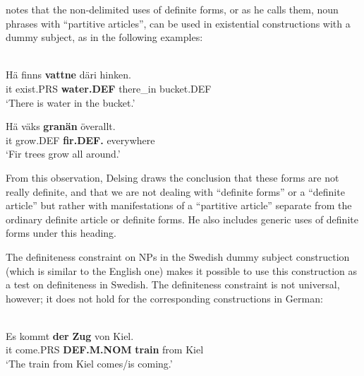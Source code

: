 \citet[51]{Delsing1993} notes that the non-delimited uses of definite forms, or as he calls them, noun phrases with “partitive articles”, can be used in existential constructions with a dummy subject, as in the following examples: 

\ea\label{}
\\
\gll 	Hä  finns  \textbf{vattne} däri  hinken.\\
		it  exist.PRS  \textbf{water.DEF} there\_in  bucket.DEF\\
\glt 	‘There is water in the bucket.’

\z

\ea
\gll 	Hä  väks  \textbf{granän} överallt.\\
		it  grow.DEF  \textbf{fir.DEF.} everywhere\\
\glt 	‘Fir trees grow all around.’
\z

From this observation, Delsing draws the conclusion that these forms are not really definite, and that we are not dealing with “definite forms” or a “definite article” but rather with manifestations of a “partitive article” separate from the ordinary definite article or definite forms. He also includes generic uses of definite forms under this heading. 

The definiteness constraint on NPs in the Swedish dummy subject construction (which is similar to the English one) makes it possible to use this construction as a test on definiteness in Swedish. The definiteness constraint is not universal, however; it does not hold for the corresponding constructions in German:

\ea \label{} 
\\
\gll Es  kommt  \textbf{der} \textbf{  Zug} von  Kiel.\\
it  come.PRS  \textbf{DEF.M.NOM} \textbf{train} from  Kiel\\
\glt ‘The train from Kiel comes/is coming.’

\z

